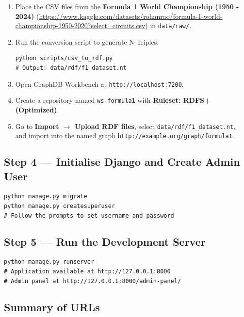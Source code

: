 \documentclass[12pt,a4paper]{article}
\begin{document}
\begin{enumerate}[leftmargin=2em]
  \item Place the CSV files from the \textbf{Formula 1 World Championship (1950 - 2024)}
(\url{https://www.kaggle.com/datasets/rohanrao/formula-1-world-championship-1950-2020?select=circuits.csv}) in \texttt{data/raw/}.
  \item Run the conversion script to generate N-Triples:
\begin{lstlisting}[style=shell]
python scripts/csv_to_rdf.py
# Output: data/rdf/f1_dataset.nt
\end{lstlisting}
  \item Open GraphDB Workbench at \texttt{http://localhost:7200}.
  \item Create a repository named \texttt{ws-formula1} with
        \textbf{Ruleset: RDFS+ (Optimized)}.
  \item Go to \textbf{Import $\rightarrow$ Upload RDF files}, select
        \texttt{data/rdf/f1\_dataset.nt}, and import into the named graph
        \texttt{http://example.org/graph/formula1}.
\end{enumerate}

\subsection{Step 4 --- Initialise Django and Create Admin User}

\begin{lstlisting}[style=shell]
python manage.py migrate
python manage.py createsuperuser
# Follow the prompts to set username and password
\end{lstlisting}

\subsection{Step 5 --- Run the Development Server}

\begin{lstlisting}[style=shell]
python manage.py runserver
# Application available at http://127.0.0.1:8000
# Admin panel at http://127.0.0.1:8000/admin-panel/
\end{lstlisting}

\subsection{Summary of URLs}
\end{document}
